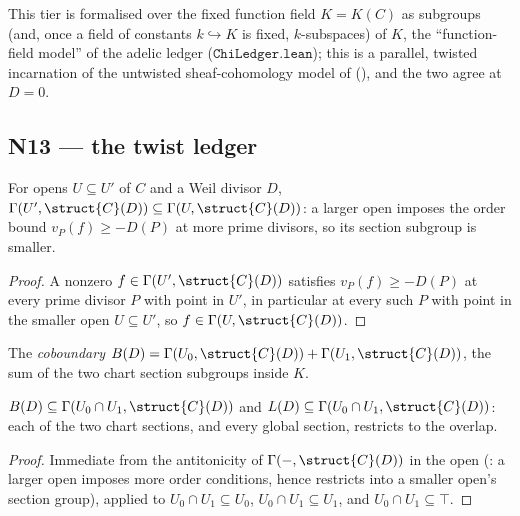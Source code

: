 This tier is formalised over the fixed function field \(K = K(C)\) as
subgroups (and, once a field of constants \(k \hookrightarrow K\) is
fixed, \(k\)-subspaces) of \(K\), the ``function-field model'' of the
adelic ledger (\(\mathtt{ChiLedger.lean}\)); this is a parallel, twisted
incarnation of the untwisted sheaf-cohomology model of
 (), and
the two agree at \(D = 0\).

\subsection{N13 --- the twist ledger}

\begin{lemma}
  \label{lem:adelic_sectionOfDivisor_antitone_open}
  \leanok
  For opens \(U \subseteq U'\) of \(C\) and a Weil divisor \(D\),
  \(\Gamma(U', \struct{C}(D)) \subseteq \Gamma(U, \struct{C}(D))\): a
  larger open imposes the order bound \(v_P(f) \ge -D(P)\) at more
  prime divisors, so its section subgroup is smaller.
\end{lemma}
\begin{proof}
  \leanok
  A nonzero \(f \in \Gamma(U', \struct{C}(D))\) satisfies
  \(v_P(f) \ge -D(P)\) at every prime divisor \(P\) with point in
  \(U'\), in particular at every such \(P\) with point in the smaller
  open \(U \subseteq U'\), so \(f \in \Gamma(U, \struct{C}(D))\).
\end{proof}

\begin{definition}
  \label{def:adelic_coboundary}
  \leanok
  The \emph{coboundary} \(B(D) = \Gamma(U_0, \struct{C}(D)) +
  \Gamma(U_1, \struct{C}(D))\), the sum of the two chart section
  subgroups inside \(K\).
\end{definition}

\begin{lemma}
  \label{lem:adelic_coboundary_le_overlap}
  \leanok
  \(B(D) \subseteq \Gamma(U_0 \cap U_1, \struct{C}(D))\) and
  \(L(D) \subseteq \Gamma(U_0 \cap U_1, \struct{C}(D))\): each of the two
  chart sections, and every global section, restricts to the overlap.
\end{lemma}
\begin{proof}
  \leanok
  Immediate from the antitonicity of \(\Gamma(-, \struct{C}(D))\) in the
  open (: a larger open
  imposes more order conditions, hence restricts into a smaller open's
  section group), applied to \(U_0 \cap U_1 \subseteq U_0\), \(U_0 \cap
  U_1 \subseteq U_1\), and \(U_0 \cap U_1 \subseteq \top\).
\end{proof}

